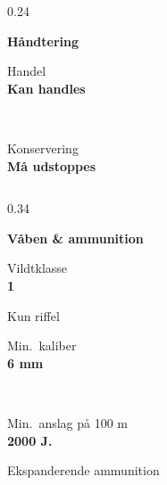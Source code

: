 \begin{frame}[plain]
\begin{columns}[T,onlytextwidth]
\begin{column}{0.24\textwidth}
\begin{tcolorbox}[gruppe, equal height group=toeraekke]
{\bfseries\color{myteal} Håndtering}\\[0.6mm]
\begin{tcolorbox}[feltfri] Handel\\ \textbf{Kan handles} \end{tcolorbox}\\[0.8mm]
\begin{tcolorbox}[feltfri] Konservering\\ \textbf{Må udstoppes} \end{tcolorbox}
\end{tcolorbox}
\end{column}
\end{columns}

\vspace{1mm}

\begin{columns}[T,onlytextwidth]
\begin{column}{0.34\textwidth}
\begin{tcolorbox}[gruppe, equal height group=bundraekke]
{\bfseries\color{myteal} Våben \& ammunition}\\[0.6mm]
\begin{minipage}[t]{0.30\linewidth}
\begin{tcolorbox}[felt] Vildtklasse\\ {\large\bfseries 1} \end{tcolorbox}
\end{minipage}\hfill
\begin{minipage}[t]{0.36\linewidth}
\begin{tcolorbox}[felt] Kun riffel\\[0.4mm]
\end{tcolorbox}
\end{minipage}\hfill
\begin{minipage}[t]{0.30\linewidth}
\begin{tcolorbox}[felt] Min.\ kaliber\\ \textbf{6 mm} \end{tcolorbox}
\end{minipage}\\[0.8mm]
\begin{minipage}[t]{0.48\linewidth}
\begin{tcolorbox}[felt] Min.\ anslag på 100 m\\ \textbf{2000 J.} \end{tcolorbox}
\end{minipage}\hfill
\begin{minipage}[t]{0.48\linewidth}
\begin{tcolorbox}[felt] Ekspanderende ammunition\\[0.4mm]
\end{tcolorbox}
\end{minipage}
\end{tcolorbox}
\end{column}


\end{columns}
\end{frame}
